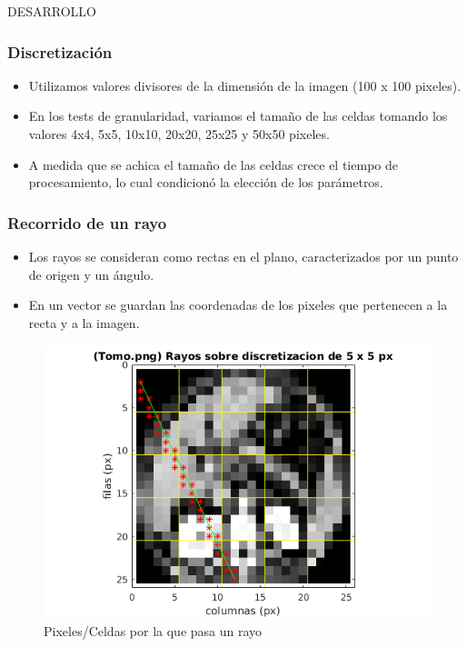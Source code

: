 \documentclass[11pt]{beamer}
\begin{document}
\begin{frame}{DESARROLLO}
\frametitle {Discretización}
\begin{itemize}
\item Utilizamos valores divisores de la dimensión de la imagen (100 x 100 pixeles).
\item En los tests de granularidad, variamos el tamaño de las celdas tomando los valores 4x4, 5x5, 10x10, 20x20, 25x25 y 50x50 pixeles.
\item A medida que se achica el tamaño de las celdas crece el tiempo de procesamiento, lo cual condicionó la elección de los parámetros.
\end{itemize}
\end{frame}


\begin{frame}
\frametitle{Recorrido de un rayo}
\begin{itemize}
\item Los rayos se consideran como rectas en el plano, caracterizados por un punto de origen y un ángulo.
\item En un vector se guardan las coordenadas de los pixeles que pertenecen a la recta y a la imagen.
\end{itemize}

\begin{figure}[H]
    \centering
    \includegraphics[scale=0.5]{img/recorridorayo.png}
    \caption{Pixeles/Celdas por la que pasa un rayo}
    \label{fig:recorridorayo}
\end{figure}
\end{frame}
\end{document}
